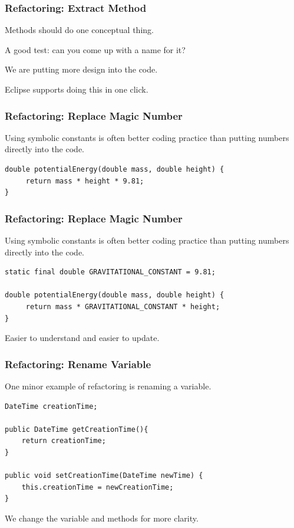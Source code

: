 \begin{frame}
\frametitle{Refactoring: Extract Method}
\begin{changemargin}{1cm}

Methods should do one conceptual thing.

A good test: can you come up with a name for it?

We are putting more design into the code.

Eclipse supports doing this in one click.

\end{changemargin}
\end{frame}

\begin{frame}[fragile]
\frametitle{Refactoring: Replace Magic Number}
\begin{changemargin}{1cm}
 Using symbolic constants is often better coding practice
than putting numbers directly into the code.

\begin{verbatim}
double potentialEnergy(double mass, double height) {
     return mass * height * 9.81;
}
\end{verbatim}

\end{changemargin}
\end{frame}

\begin{frame}[fragile]
\frametitle{Refactoring: Replace Magic Number}
\begin{changemargin}{1cm}
 Using symbolic constants is often better coding practice
than putting numbers directly into the code.

\begin{verbatim}
static final double GRAVITATIONAL_CONSTANT = 9.81;

double potentialEnergy(double mass, double height) {
     return mass * GRAVITATIONAL_CONSTANT * height;
}
\end{verbatim}

Easier to understand and easier to update.

\end{changemargin}
\end{frame}

\begin{frame}[fragile]
\frametitle{Refactoring: Rename Variable}
\begin{changemargin}{1cm}
One minor example of refactoring is renaming a variable.


\begin{verbatim}
DateTime creationTime;

public DateTime getCreationTime(){
    return creationTime;
}

public void setCreationTime(DateTime newTime) {
    this.creationTime = newCreationTime;
}

\end{verbatim}

We change the variable and methods for more clarity.

\end{changemargin}
\end{frame}

